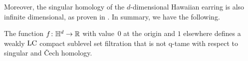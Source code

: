 %
%
%
%
%
Moreover, the singular homology of the $d$-dimensional Hawaiian earring is also infinite dimensional, as proven in \cite{Barratt.1962}. In summary, we have the following.

\begin{cor} \label{c:counterexample}
	The function $f \colon \mathbb{H}^d \to \mathbb{R}$ with value~$0$ at the origin and $1$ elsewhere defines a weakly $\mathrm{LC}$ compact sublevel set filtration that is not q-tame with respect to singular and \v{C}ech homology.
\end{cor}

